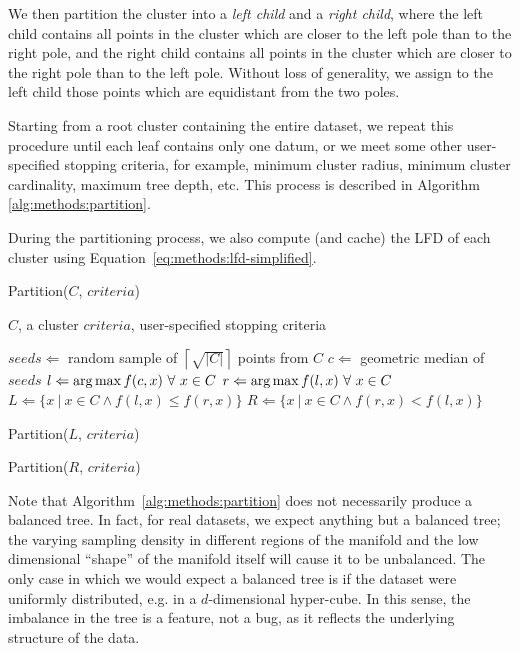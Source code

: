 We then partition the cluster into a \textit{left child} and a \textit{right child}, where the left child contains all points in the cluster which are closer to the left pole than to the right pole, and the right child contains all points in the cluster which are closer to the right pole than to the left pole.
Without loss of generality, we assign to the left child those points which are equidistant from the two poles.

Starting from a root cluster containing the entire dataset, we repeat this procedure until each leaf contains only one datum, or we meet some other user-specified stopping criteria, for example, minimum cluster radius, minimum cluster cardinality, maximum tree depth, etc.
This process is described in Algorithm \ref{alg:methods:partition}.

During the partitioning process, we also compute (and cache) the LFD of each cluster using Equation~\ref{eq:methods:lfd-simplified}.

\begin{algorithm} %
    \caption{Partition($C$, $criteria$)} %
    \label{alg:methods:partition} %
    \begin{algorithmic} %
        \REQUIRE $C$, a cluster
        \REQUIRE $criteria$, user-specified stopping criteria

        \STATE $seeds \Leftarrow$ random sample of $\left\lceil \sqrt{|C|} \right\rceil$ points from $C$
        \STATE $c \Leftarrow$ geometric median of $seeds$
        \STATE $l \Leftarrow \operatorname*{arg\,max} f(c, x) \ \forall \ x \in C$
        \STATE $r \Leftarrow \argmax f(l, x) \ \forall \ x \in C$
        \STATE $L \Leftarrow \{x \ | \ x \in C \land f(l, x) \le f(r, x)\}$
        \STATE $R \Leftarrow \{x \ | \ x \in C \land f(r, x) < f(l, x)\}$
        
            \STATE Partition($L$, $criteria$)
        \ENDIF
        
            \STATE Partition($R$, $criteria$)
        \ENDIF
    \end{algorithmic}
\end{algorithm}

Note that Algorithm~\ref{alg:methods:partition} does not necessarily produce a balanced tree.
In fact, for real datasets, we expect anything but a balanced tree; the varying sampling density in different regions of the manifold and the low dimensional ``shape'' of the manifold itself will cause it to be unbalanced.
The only case in which we would expect a balanced tree is if the dataset were uniformly distributed, e.g. in a $d$-dimensional hyper-cube.
In this sense, the imbalance in the tree is a feature, not a bug, as it reflects the underlying structure of the data.


